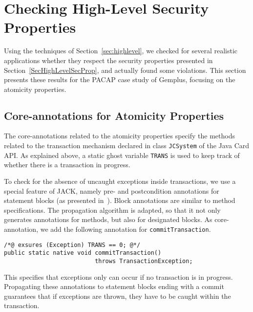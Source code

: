 \section{Checking High-Level Security Properties}\label{SecResults} 

Using the techniques of Section~\ref{sec:highlevel}, we checked for
several realistic applications whether they respect the security
properties presented in Section~\ref{SecHighLevelSecProp}, and
actually found some violations.  This section presents these results
for the PACAP case study of Gemplus, focusing on the atomicity properties.


\subsection{Core-annotations for Atomicity Properties}

The core-annotations related to the atomicity properties specify the
methods related to the transaction mechanism declared in class
\texttt{JCSystem} of the Java Card API. As explained above, a static
ghost variable \texttt{TRANS} is used to keep track of whether there
is a transaction in progress.  


To check for the absence of uncaught exceptions inside transactions,
we use a special feature of JACK, namely pre- and postcondition
annotations for statement blocks (as presented
in~\cite{BRL-JACK}). Block annotations are  similar to method
specifications. The propagation algorithm is adapted, so that it not
only generates annotations for methods, but also for designated
blocks. As core-annotation, we add the following annotation for
\texttt{commitTransaction}. 
\begin{verbatim}
/*@ exsures (Exception) TRANS == 0; @*/
public static native void commitTransaction() 
                          throws TransactionException;
\end{verbatim}
This specifies that exceptions only can occur if no transaction is in
progress. Propagating these annotations to statement blocks ending
with a commit guarantees that if exceptions are thrown, they have to
be caught within the transaction.




